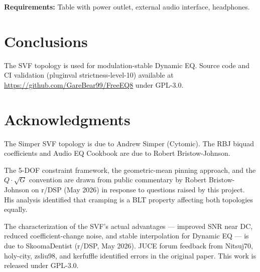 \documentclass[twoside,a4paper]{article}
\begin{document}
\textbf{Requirements:} Table with power outlet, external audio interface, headphones.

\section{Conclusions}
The SVF topology is used for modulation-stable Dynamic EQ. Source code and CI validation (pluginval strictness-level-10) available at \url{https://github.com/GareBear99/FreeEQ8} under GPL-3.0.

\section{Acknowledgments}
The Simper SVF topology is due to Andrew Simper (Cytomic). The RBJ biquad coefficients and Audio EQ Cookbook are due to Robert Bristow-Johnson.

The 5-DOF constraint framework, the geometric-mean pinning approach, and the $Q\cdot\sqrt{G}$ convention are drawn from public commentary by Robert Bristow-Johnson on r/DSP (May 2026) in response to questions raised by this project. His analysis identified that cramping is a BLT property affecting both topologies equally.

The characterization of the SVF's actual advantages --- improved SNR near DC, reduced coefficient-change noise, and stable interpolation for Dynamic EQ --- is due to SkoomaDentist (r/DSP, May 2026). JUCE forum feedback from Nitsuj70, holy-city, zsliu98, and kerfuffle identified errors in the original paper. This work is released under GPL-3.0.
\end{document}
